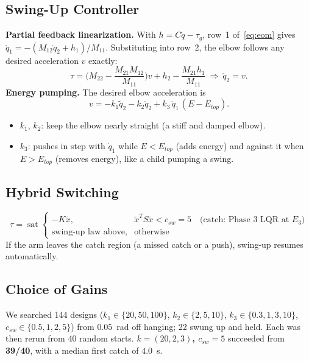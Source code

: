 \documentclass[12pt,a4paper]{article}
\begin{document}
\subsection{Swing-Up Controller}
\textbf{Partial feedback linearization.} With $h=C\dot q-\tau_g$, row~1 of~\eqref{eq:eom} gives $\ddot q_1=-(M_{12}\ddot q_2+h_1)/M_{11}$. Substituting into row~2, the elbow follows any desired acceleration $v$ exactly:
\begin{equation}
\tau=\Big(M_{22}-\frac{M_{21}M_{12}}{M_{11}}\Big)v+h_2-\frac{M_{21}h_1}{M_{11}}\ \Rightarrow\ \ddot q_2=v .
\end{equation}
\textbf{Energy pumping.} The desired elbow acceleration is
\begin{equation}
v=-k_1\tilde q_2-k_2\dot q_2+k_3\,\dot q_1\,(E-E_{top}) .\label{eq:v}
\end{equation}
\begin{itemize}
\item $k_1$, $k_2$: keep the elbow nearly straight (a stiff and damped elbow).
\item $k_3$: pushes in step with $\dot q_1$ while $E<E_{top}$ (adds energy) and against it when $E>E_{top}$ (removes energy), like a child pumping a swing.
\end{itemize}

\subsection{Hybrid Switching}
\begin{equation}
\tau=\operatorname{sat}\begin{cases}-K\tilde x, & \tilde x^TS\tilde x<c_{sw}=5\quad\text{(catch: Phase 3 LQR at $E_3$)}\\ \text{swing-up law above}, & \text{otherwise}\end{cases}
\end{equation}
If the arm leaves the catch region (a missed catch or a push), swing-up resumes automatically.

\subsection{Choice of Gains}
We searched 144 designs ($k_1\in\{20,50,100\}$, $k_2\in\{2,5,10\}$, $k_3\in\{0.3,1,3,10\}$, $c_{sw}\in\{0.5,1,2,5\}$) from $0.05$~rad off hanging; 22 swung up and held. Each was then rerun from 40 random starts. \textbf{$k=(20,2,3)$, $c_{sw}=5$} succeeded from \textbf{39/40}, with a median first catch of $4.0$~s.
\end{document}
